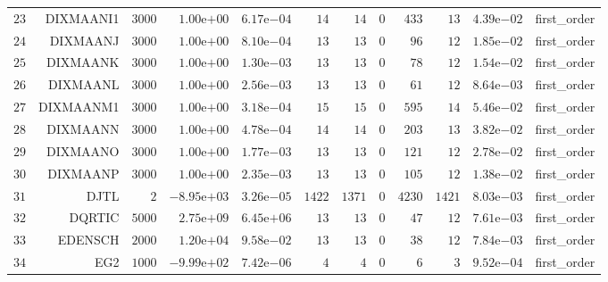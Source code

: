 \begin{longtable}{rrrrrrrrrrrr}
  \(    23\) & DIXMAANI1 & \(  3000\) & \( 1.00\)e\(+00\) & \( 6.17\)e\(-04\) & \(    14\) & \(    14\) & \(     0\) & \(   433\) & \(    13\) & \( 4.39\)e\(-02\) & first\_order \\
  \(    24\) & DIXMAANJ & \(  3000\) & \( 1.00\)e\(+00\) & \( 8.10\)e\(-04\) & \(    13\) & \(    13\) & \(     0\) & \(    96\) & \(    12\) & \( 1.85\)e\(-02\) & first\_order \\
  \(    25\) & DIXMAANK & \(  3000\) & \( 1.00\)e\(+00\) & \( 1.30\)e\(-03\) & \(    13\) & \(    13\) & \(     0\) & \(    78\) & \(    12\) & \( 1.54\)e\(-02\) & first\_order \\
  \(    26\) & DIXMAANL & \(  3000\) & \( 1.00\)e\(+00\) & \( 2.56\)e\(-03\) & \(    13\) & \(    13\) & \(     0\) & \(    61\) & \(    12\) & \( 8.64\)e\(-03\) & first\_order \\
  \(    27\) & DIXMAANM1 & \(  3000\) & \( 1.00\)e\(+00\) & \( 3.18\)e\(-04\) & \(    15\) & \(    15\) & \(     0\) & \(   595\) & \(    14\) & \( 5.46\)e\(-02\) & first\_order \\
  \(    28\) & DIXMAANN & \(  3000\) & \( 1.00\)e\(+00\) & \( 4.78\)e\(-04\) & \(    14\) & \(    14\) & \(     0\) & \(   203\) & \(    13\) & \( 3.82\)e\(-02\) & first\_order \\
  \(    29\) & DIXMAANO & \(  3000\) & \( 1.00\)e\(+00\) & \( 1.77\)e\(-03\) & \(    13\) & \(    13\) & \(     0\) & \(   121\) & \(    12\) & \( 2.78\)e\(-02\) & first\_order \\
  \(    30\) & DIXMAANP & \(  3000\) & \( 1.00\)e\(+00\) & \( 2.35\)e\(-03\) & \(    13\) & \(    13\) & \(     0\) & \(   105\) & \(    12\) & \( 1.38\)e\(-02\) & first\_order \\
  \(    31\) & DJTL & \(     2\) & \(-8.95\)e\(+03\) & \( 3.26\)e\(-05\) & \(  1422\) & \(  1371\) & \(     0\) & \(  4230\) & \(  1421\) & \( 8.03\)e\(-03\) & first\_order \\
  \(    32\) & DQRTIC & \(  5000\) & \( 2.75\)e\(+09\) & \( 6.45\)e\(+06\) & \(    13\) & \(    13\) & \(     0\) & \(    47\) & \(    12\) & \( 7.61\)e\(-03\) & first\_order \\
  \(    33\) & EDENSCH & \(  2000\) & \( 1.20\)e\(+04\) & \( 9.58\)e\(-02\) & \(    13\) & \(    13\) & \(     0\) & \(    38\) & \(    12\) & \( 7.84\)e\(-03\) & first\_order \\
  \(    34\) & EG2 & \(  1000\) & \(-9.99\)e\(+02\) & \( 7.42\)e\(-06\) & \(     4\) & \(     4\) & \(     0\) & \(     6\) & \(     3\) & \( 9.52\)e\(-04\) & first\_order \\

\end{longtable}
